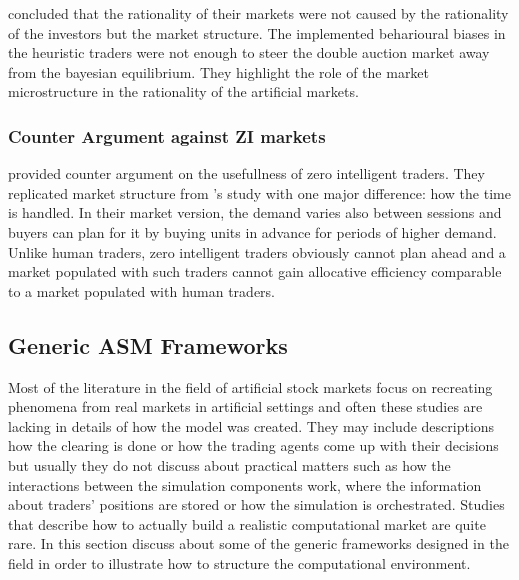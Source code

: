 \citeauthor{Jam96} concluded that the rationality of their markets were
not caused by the rationality of the investors but the market structure.
The implemented beharioural biases in the heuristic traders were not enough 
to steer the double auction market away from the bayesian equilibrium.
They highlight the role of the market microstructure in the rationality 
of the artificial markets. \\


\subsubsection{Counter Argument against ZI markets}
\citet{Mil08} provided counter argument on the usefullness of zero
intelligent traders. They replicated market structure from
\citeauthor{God93}'s study with one major difference: how the 
time is handled. In their market version, the demand varies
also between sessions and buyers can plan for it by buying units
in advance for periods of higher demand. Unlike human traders,
zero intelligent traders obviously cannot plan ahead and a market
populated with such traders cannot gain allocative efficiency comparable
to a market populated with human traders. 


\subsection{Generic ASM Frameworks}

Most of the literature in the field of artificial stock markets 
focus on recreating phenomena from real markets in artificial settings
and often these studies are lacking in details of how the model was created.
They may include descriptions how the clearing is done or how the trading agents 
come up with their decisions but usually they do not discuss about practical matters 
such as how the interactions between the simulation components work, where the 
information about traders' positions are stored or how the simulation is orchestrated. 
Studies that describe how to actually build a realistic computational 
market are quite rare. In this section discuss about some of the generic
frameworks designed in the field in order to illustrate how to structure the computational
environment.


